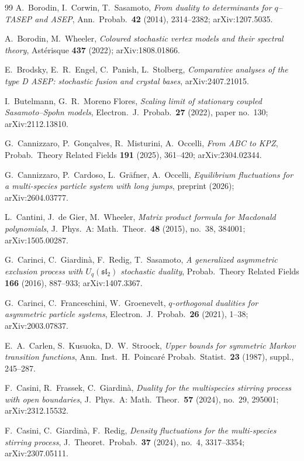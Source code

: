 \documentclass[11pt]{article}
\theoremstyle{plain}
\theoremstyle{definition}
\theoremstyle{remark}
\newcommand{\sutwo}{\mathfrak{sl}_2}\newcommand{\Lt}{\widetilde{\mathcal L}}
\begin{document}
\begin{thebibliography}{99}
 A.~Borodin, I.~Corwin, T.~Sasamoto, \emph{From duality to determinants for
$q$--TASEP and ASEP}, Ann.~Probab.~\textbf{42} (2014), 2314--2382; arXiv:1207.5035.

 A.~Borodin, M.~Wheeler, \emph{Coloured stochastic vertex
models and their spectral theory}, Ast\'erisque \textbf{437} (2022); arXiv:1808.01866.

 E.~Brodsky, E.~R.~Engel, C.~Panish, L.~Stolberg, \emph{Comparative
analyses of the type D ASEP: stochastic fusion and crystal bases}, arXiv:2407.21015.

 I.~Butelmann, G.~R.~Moreno Flores, \emph{Scaling limit of
stationary coupled Sasamoto--Spohn models}, Electron.~J.~Probab.~\textbf{27}
(2022), paper no.~130; arXiv:2112.13810.

 G.~Cannizzaro, P.~Gon\c{c}alves, R.~Misturini, A.~Occelli, \emph{From
ABC to KPZ}, Probab.~Theory Related Fields \textbf{191} (2025), 361--420;
arXiv:2304.02344.

 G.~Cannizzaro, P.~Cardoso, L.~Gr\"afner, A.~Occelli, \emph{Equilibrium
fluctuations for a multi-species particle system with long jumps}, preprint (2026);
arXiv:2604.03777.

 L.~Cantini, J.~de Gier, M.~Wheeler, \emph{Matrix product formula
for Macdonald polynomials}, J.~Phys.~A: Math.~Theor.~\textbf{48} (2015), no.~38,
384001; arXiv:1505.00287.

 G.~Carinci, C.~Giardin\`a, F.~Redig, T.~Sasamoto, \emph{A generalized
asymmetric exclusion process with $U_q(\sutwo)$ stochastic duality}, Probab.~Theory
Related Fields \textbf{166} (2016), 887--933; arXiv:1407.3367.

 G.~Carinci, C.~Franceschini, W.~Groenevelt, \emph{$q$-orthogonal
dualities for asymmetric particle systems}, Electron.~J.~Probab.~\textbf{26} (2021),
1--38; arXiv:2003.07837.

 E.~A.~Carlen, S.~Kusuoka, D.~W.~Stroock, \emph{Upper bounds for symmetric
Markov transition functions}, Ann.~Inst.~H.~Poincar\'e Probab.~Statist.~\textbf{23}
(1987), suppl., 245--287.

 F.~Casini, R.~Frassek, C.~Giardin\`a, \emph{Duality for the
multispecies stirring process with open boundaries}, J.~Phys.~A: Math.~Theor.~\textbf{57}
(2024), no.~29, 295001; arXiv:2312.15532.

 F.~Casini, C.~Giardin\`a, F.~Redig, \emph{Density fluctuations
for the multi-species stirring process}, J.~Theoret.~Probab.~\textbf{37} (2024),
no.~4, 3317--3354; arXiv:2307.05111.


\end{thebibliography}
\end{document}
